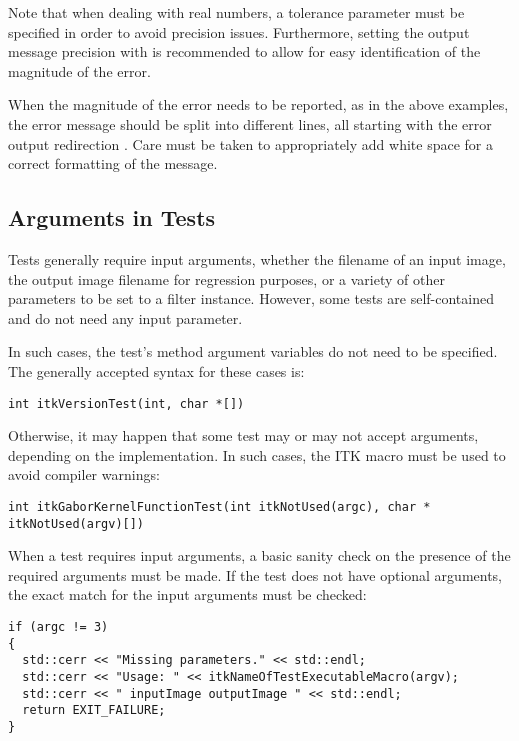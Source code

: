 Note that when dealing with real numbers, a tolerance parameter must be
specified in order to avoid precision issues. Furthermore, setting the output
message precision with  is recommended to
allow for easy identification of the magnitude of the error.

When the magnitude of the error needs to be reported, as in the above examples,
the error message should be split into different lines, all starting with the
error output redirection . Care must be taken to
appropriately add white space for a correct formatting of the message.


\subsection{Arguments in Tests}
\label{subsec:ArgumentsInTests}

Tests generally require input arguments, whether the filename of an input image,
the output image filename for regression purposes, or a variety of other
parameters to be set to a filter instance. However, some tests are
self-contained and do not need any input parameter.

In such cases, the test's  method argument variables do not need to
be specified. The generally accepted syntax for these cases is:

\small
\begin{verbatim}
int itkVersionTest(int, char *[])
\end{verbatim}
\normalsize

Otherwise, it may happen that some test may or may not accept arguments,
depending on the implementation. In such cases, the  ITK macro
must be used to avoid compiler warnings:

\small
\begin{verbatim}
int itkGaborKernelFunctionTest(int itkNotUsed(argc), char * itkNotUsed(argv)[])
\end{verbatim}
\normalsize

When a test requires input arguments, a basic sanity check on the presence of
the required arguments must be made. If the test does not have optional
arguments, the exact match for the input arguments must be checked:

\small
\begin{verbatim}
if (argc != 3)
{
  std::cerr << "Missing parameters." << std::endl;
  std::cerr << "Usage: " << itkNameOfTestExecutableMacro(argv);
  std::cerr << " inputImage outputImage " << std::endl;
  return EXIT_FAILURE;
}
\end{verbatim}
\normalsize

